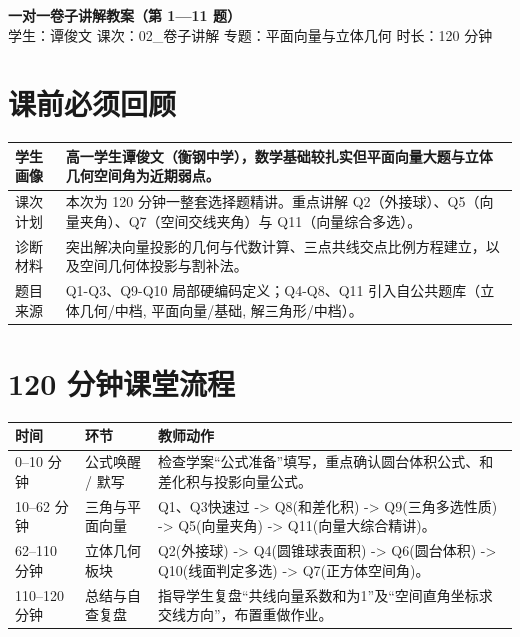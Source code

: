 \documentclass[11pt,a4paper]{ctexart}
\begin{document}
\begin{center}
  {\Large\bfseries 一对一卷子讲解教案（第 1—11 题）}\\
  \vspace{0.5em}
  学生：谭俊文 \quad 课次：02\_卷子讲解 \quad 专题：平面向量与立体几何 \quad 时长：120 分钟
\end{center}

\section{课前必须回顾}
\begin{tabularx}{\textwidth}{p{4cm}X}
\toprule
学生画像 & 高一学生谭俊文（衡钢中学），数学基础较扎实但平面向量大题与立体几何空间角为近期弱点。\\ \hline
课次计划 & 本次为 120 分钟一整套选择题精讲。重点讲解 Q2（外接球）、Q5（向量夹角）、Q7（空间交线夹角）与 Q11（向量综合多选）。\\ \hline
诊断材料 & 突出解决向量投影的几何与代数计算、三点共线交点比例方程建立，以及空间几何体投影与割补法。\\ \hline
题目来源 & Q1-Q3、Q9-Q10 局部硬编码定义；Q4-Q8、Q11 引入自公共题库（立体几何/中档, 平面向量/基础, 解三角形/中档）。\\
\bottomrule
\end{tabularx}

\section{120 分钟课堂流程}
\begin{tabularx}{\textwidth}{p{2.8cm}p{3.2cm}X}
\toprule
时间 & 环节 & 教师动作\\
\midrule
0--10 分钟 & 公式唤醒 / 默写 & 检查学案“公式准备”填写，重点确认圆台体积公式、和差化积与投影向量公式。\\ \hline
10--62 分钟 & 三角与平面向量 & Q1、Q3快速过 -> Q8(和差化积) -> Q9(三角多选性质) -> Q5(向量夹角) -> Q11(向量大综合精讲)。\\ \hline
62--110 分钟 & 立体几何板块 & Q2(外接球) -> Q4(圆锥球表面积) -> Q6(圆台体积) -> Q10(线面判定多选) -> Q7(正方体空间角)。\\ \hline
110--120 分钟 & 总结与自查复盘 & 指导学生复盘“共线向量系数和为1”及“空间直角坐标求交线方向”，布置重做作业。\\
\bottomrule
\end{tabularx}
\end{document}
